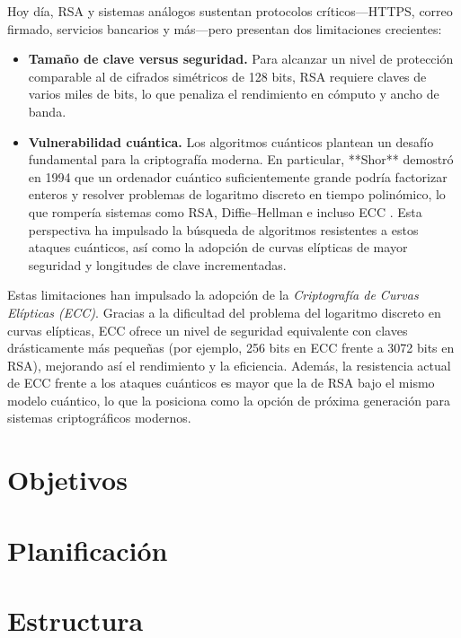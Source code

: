 Hoy día, RSA y sistemas análogos sustentan protocolos críticos—HTTPS, correo firmado, servicios bancarios y más—pero presentan dos limitaciones crecientes:  
\begin{itemize}  
  \item \textbf{Tamaño de clave versus seguridad.} Para alcanzar un nivel de protección comparable al de cifrados simétricos de 128 bits, RSA requiere claves de varios miles de bits, lo que penaliza el rendimiento en cómputo y ancho de banda.  
  \item \textbf{Vulnerabilidad cuántica.} 
  Los algoritmos cuánticos plantean un desafío fundamental para la criptografía moderna. En particular, **Shor** demostró en 1994 que un ordenador cuántico suficientemente grande podría factorizar enteros y resolver problemas de logaritmo discreto en tiempo polinómico, lo que rompería sistemas como RSA, Diffie–Hellman e incluso ECC \cite{turn2search1}\cite{turn2search2}. Esta perspectiva ha impulsado la búsqueda de algoritmos resistentes a estos ataques cuánticos, así como la adopción de curvas elípticas de mayor seguridad y longitudes de clave incrementadas.  
\end{itemize}  

Estas limitaciones han impulsado la adopción de la \emph{Criptografía de Curvas Elípticas (ECC)}. Gracias a la dificultad del problema del logaritmo discreto en curvas elípticas, ECC ofrece un nivel de seguridad equivalente con claves drásticamente más pequeñas (por ejemplo, 256 bits en ECC frente a 3072 bits en RSA), mejorando así el rendimiento y la eficiencia. Además, la resistencia actual de ECC frente a los ataques cuánticos es mayor que la de RSA bajo el mismo modelo cuántico, lo que la posiciona como la opción de próxima generación para sistemas criptográficos modernos.

\section{Objetivos}

\section{Planificación}

\section{Estructura}
